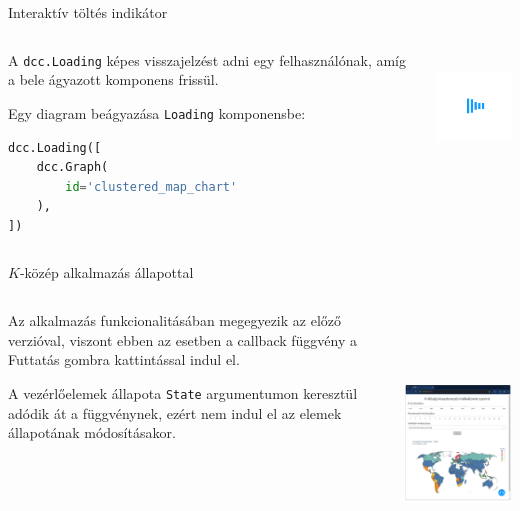 \documentclass[english, aspectratio=169]{beamer}
\begin{document}
\begin{frame}[fragile]{Interaktív töltés indikátor}
	\begin{columns}
		\begin{column}{.5\textwidth}
			A \texttt{dcc.Loading} képes visszajelzést adni egy felhasználónak, amíg a bele ágyazott komponens frissül.\par\smallskip
			Egy diagram beágyazása \texttt{Loading} komponensbe:
			\begin{lstlisting}[language=python]
dcc.Loading([
	dcc.Graph(
		id='clustered_map_chart'
	),
])
			\end{lstlisting}
		\end{column}
		\begin{column}{.5\textwidth}
			\begin{center}
				\includegraphics[width=3cm, height=3cm, keepaspectratio]{images/freq_21.png}
			\end{center}
		\end{column}
	\end{columns}
\end{frame}


\begin{frame}[fragile]{$K$-közép alkalmazás állapottal}
	\begin{columns}
		\begin{column}{.5\textwidth}
			Az alkalmazás funkcionalitásában megegyezik az előző verzióval, viszont ebben az esetben a callback függvény a Futtatás gombra kattintással indul el.\par\smallskip
			A vezérlőelemek állapota \texttt{State} argumentumon keresztül adódik át a függvénynek, ezért nem indul el az elemek állapotának módosításakor. 
		\end{column}
		\begin{column}{.5\textwidth}
			\begin{center}
				\includegraphics[width=7cm, height=7cm, keepaspectratio]{images/freq_22.png}
			\end{center}
		\end{column}
	\end{columns}
\end{frame}
\end{document}
